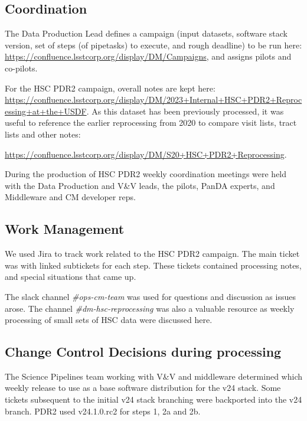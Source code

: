 \subsection{Coordination}

The Data Production Lead defines a campaign (input datasets, 
software stack version, set of steps (of pipetasks) to execute, and 
rough deadline) to be run 
here: \url{https://confluence.lsstcorp.org/display/DM/Campaigns}, and assigns pilots and co-pilots.

For the HSC PDR2 campaign, overall notes are kept here: \url{https://confluence.lsstcorp.org/display/DM/2023+Internal+HSC+PDR2+Reprocessing+at+the+USDF}.   As this dataset has been previously processed, it was useful
to reference the earlier reprocessing from 2020 to compare visit lists, tract lists and other notes:

\url{https://confluence.lsstcorp.org/display/DM/S20+HSC+PDR2+Reprocessing}.

During the production of HSC PDR2 weekly coordination meetings were held with the Data Production and V\&V leads, the pilots, PanDA experts, 
and Middleware and CM developer reps. 

\subsection{Work Management}

We used Jira to track work related to the HSC PDR2 campaign.
The main ticket was  with linked subtickets for each step.
These tickets contained processing notes, and special situations that came up.

The slack channel {\it\#ops-cm-team} was used for questions and discussion as issues arose.
The channel {\it\#dm-hsc-reprocessing} was also a valuable resource as 
weekly processing of small sets of HSC data were discussed here.

\subsection{Change Control Decisions during processing}

The Science Pipelines team working with V\&V and middleware determined which weekly release to use as a base
software distribution for the v24 stack.  Some tickets subsequent to the initial v24 stack branching
were backported into the v24 branch.  PDR2 used v24.1.0.rc2 for steps 1, 2a and 2b.

